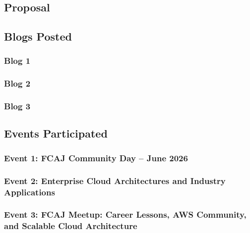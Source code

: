 \newpage

\subsection{Proposal}



\newpage

\subsection{Blogs Posted}

\subsubsection{Blog 1}


\subsubsection{Blog 2}


\subsubsection{Blog 3}


\newpage

\subsection{Events Participated}

\subsubsection{Event 1: FCAJ Community Day – June 2026}


\subsubsection{Event 2: Enterprise Cloud Architectures and Industry Applications}


\subsubsection{Event 3: FCAJ Meetup: Career Lessons, AWS Community, and Scalable Cloud Architecture}



